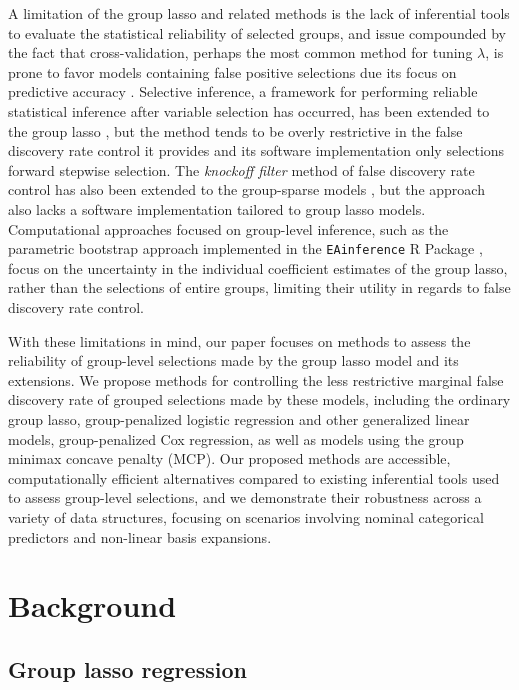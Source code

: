 A limitation of the group lasso and related methods is the lack of inferential tools to evaluate the statistical reliability of selected groups, and issue compounded by the fact that cross-validation, perhaps the most common method for tuning $\lambda$, is prone to favor models containing false positive selections due its focus on predictive accuracy \citep{Kim2017}. Selective inference, a framework for performing reliable statistical inference after variable selection has occurred, has been extended to the group lasso \citep{Yang2016}, but the method tends to be overly restrictive in the false discovery rate control it provides \citep{Miller2023} and its software implementation only selections forward stepwise selection. The \textit{knockoff filter} method of false discovery rate control \citep{barber2015, candes2018} has also been extended to the group-sparse models \citep{Dai2016}, but the approach also lacks a software implementation tailored to group lasso models. Computational approaches focused on group-level inference, such as the parametric bootstrap approach implemented in the {\tt EAinference} R Package \citep{Zhou2017}, focus on the uncertainty in the individual coefficient estimates of the group lasso, rather than the selections of entire groups, limiting their utility in regards to false discovery rate control.

With these limitations in mind, our paper focuses on methods to assess the reliability of group-level selections made by the group lasso model and its extensions. We propose methods for controlling the less restrictive marginal false discovery rate \citep{Breheny2019} of grouped selections made by these models, including the ordinary group lasso, group-penalized logistic regression and other generalized linear models, group-penalized Cox regression, as well as models using the group minimax concave penalty (MCP). Our proposed methods are accessible, computationally efficient alternatives compared to existing inferential tools used to assess group-level selections, and we demonstrate their robustness across a variety of data structures, focusing on scenarios involving nominal categorical predictors and non-linear basis expansions.
\section{Background}

\subsection{Group lasso regression}

